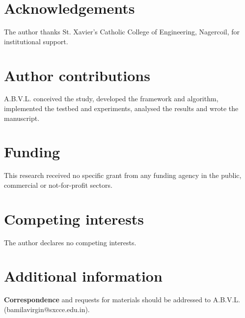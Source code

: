 \documentclass[11pt]{article}
\begin{document}
\section*{Acknowledgements}
The author thanks St. Xavier's Catholic College of Engineering, Nagercoil, for institutional support.

\section*{Author contributions}
A.B.V.L. conceived the study, developed the framework and algorithm, implemented the testbed and experiments, analysed the results and wrote the manuscript.

\section*{Funding}
This research received no specific grant from any funding agency in the public, commercial or not-for-profit sectors.

\section*{Competing interests}
The author declares no competing interests.

\section*{Additional information}
\textbf{Correspondence} and requests for materials should be addressed to A.B.V.L. (bamilavirgin@sxcce.edu.in).


\end{document}
